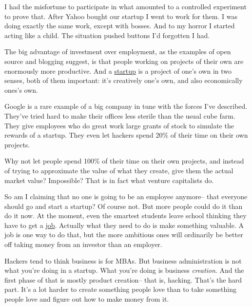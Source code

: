 I
                  had the misfortune to participate in what amounted to a
                  controlled experiment to prove that. After Yahoo bought our
                  startup I went to work for them. I was doing exactly the same
                  work, except with bosses. And to my horror I started acting
                  like a child. The situation pushed buttons I'd forgotten I
                  had.

The big advantage of investment over
                  employment, as the examples of open source and blogging
                  suggest, is that people working on projects of their own are
                  enormously more productive. And a
                  \href{http://www.paulgraham.com/start.html}{startup} is a project of one's own in
                  two senses, both of them important: it's creatively one's own,
                  and also economically ones's own.

Google is a rare
                  example of a big company in tune with the forces I've
                  described. They've tried hard to make their offices less
                  sterile than the usual cube farm. They give employees who do
                  great work large grants of stock to simulate the rewards of a
                  startup. They even let hackers spend 20\% of their time on
                  their own projects.

Why not let people spend 100\%
                  of their time on their own projects, and instead of trying to
                  approximate the value of what they create, give them the
                  actual market value? Impossible? That is in fact what venture
                  capitalists do.

So am I claiming that no one is
                  going to be an employee anymore-- that everyone should go and
                  start a startup? Of course not. But more people could do it
                  than do it now. At the moment, even the smartest students
                  leave school thinking they have to get a
                  \href{http://www.paulgraham.com/hiring.html}{job}. Actually what they need to do
                  is make something valuable. A job is one way to do that, but
                  the more ambitious ones will ordinarily be better off taking
                  money from an investor than an employer.

Hackers
                  tend to think business is for MBAs. But business
                  administration is not what you're doing in a startup. What
                  you're doing is business \emph{creation}. And the first phase
                  of that is mostly product creation-- that is, hacking. That's
                  the hard part. It's a lot harder to create something people
                  love than to take something people love and figure out how to
                  make money from it.

